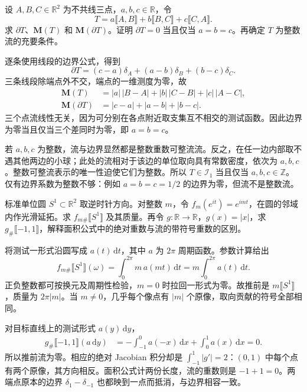 \BookExercises

\begin{exercise}\label{g3:ex:weighted-triangle-current}
	设 \(A,B,C\in\mathbb R^2\) 为不共线三点，\(a,b,c\in\mathbb R\)，令
	\[
		T=a\lBrack A,B\rBrack+b\lBrack B,C\rBrack+c\lBrack C,A\rBrack.
	\]
	求 \(\partial T\)、\(\mathbf M(T)\) 和 \(\mathbf M(\partial T)\)。证明 \(\partial T=0\) 当且仅当 \(a=b=c\)。再确定 \(T\) 为整数流的充要条件。
\end{exercise}
\begin{solution}
	逐条使用线段的边界公式，得到
	\[
		\partial T=(c-a)\delta_A+(a-b)\delta_B+(b-c)\delta_C.
	\]
	三条线段除端点外不交，端点的一维测度为零，故
	\[
	\begin{aligned}
		\mathbf M(T)&=|a|\,|B-A|+|b|\,|C-B|+|c|\,|A-C|,\\
		\mathbf M(\partial T)&=|c-a|+|a-b|+|b-c|.
	\end{aligned}
	\]
	三个点流线性无关，因为可分别在各点附近取支集互不相交的测试函数。因此边界为零当且仅当三个差同时为零，即 \(a=b=c\)。

	若 \(a,b,c\) 为整数，流与边界显然都是整数重数可整流流。反之，在任一边内部取不遇其他两边的小球；此处的流相对于该边的单位取向具有常数密度，依次为 \(a,b,c\)。整数可整流表示的唯一性迫使它们为整数。所以 \(T\in\mathcal I_1\) 当且仅当 \(a,b,c\in\mathbb Z\)。仅有边界系数为整数不够：例如 \(a=b=c=1/2\) 的边界为零，但流不是整数流。
\end{solution}

\begin{exercise}\label{g3:ex:pushforward-degree-and-fold}
	标准单位圆 \(S^1\subset\mathbb R^2\) 取逆时针方向。对整数 \(m\)，令 \(f_m(e^{it})=e^{imt}\)，在圆的邻域内作光滑延拓。求 \(f_{m\#}\lBrack S^1\rBrack\) 及其质量。再令 \(g:\mathbb R\to\mathbb R\)，\(g(x)=|x|\)，求 \(g_\#\lBrack-1,1\rBrack\)，解释面积公式中的绝对重数与流的带符号重数的区别。
\end{exercise}
\begin{solution}
	将测试一形式沿圆写成 \(a(t)\,\mathrm dt\)，其中 \(a\) 为 \(2\pi\) 周期函数。参数计算给出
	\[
		f_{m\#}\lBrack S^1\rBrack(\omega)
		=\int_0^{2\pi}m\,a(mt)\,\mathrm dt
		=m\int_0^{2\pi}a(t)\,\mathrm dt.
	\]
	正负整数都可按换元及周期性检验，\(m=0\) 时拉回一形式为零。故推前是 \(m\lBrack S^1\rBrack\)，质量为 \(2\pi|m|\)。当 \(m\ne0\)，几乎每个像点有 \(|m|\) 个原像，取向贡献的符号全部相同。

	对目标直线上的测试形式 \(a(y)\,\mathrm dy\)，
	\[
	\begin{aligned}
		g_\#\lBrack-1,1\rBrack(a\,\mathrm dy)
		&=-\int_{-1}^0a(-x)\,\mathrm dx+\int_0^1a(x)\,\mathrm dx=0.
	\end{aligned}
	\]
	所以推前流为零。相应的绝对 Jacobian 积分却是 \(\int_{-1}^1|g'|=2\)：\((0,1)\) 中每个点有两个原像，其方向相反。面积公式计两份长度，流的重数则是 \(-1+1=0\)。两端点原本的边界 \(\delta_1-\delta_{-1}\) 也都映到一点而抵消，与边界相容一致。
\end{solution}


